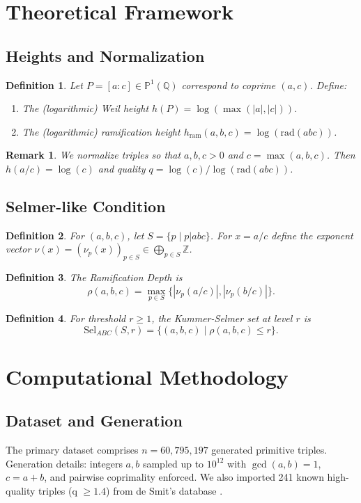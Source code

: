 \documentclass[11pt,a4paper]{article}
\newtheorem{definition}{Definition}[section]
\newtheorem{remark}{Remark}[section]
\newcommand{\Q}{\mathbb{Q}}
\newcommand{\Z}{\mathbb{Z}}
\newcommand{\Pp}{\mathbb{P}}
\newcommand{\rad}{\mathrm{rad}}
\newcommand{\Sel}{\mathrm{Sel}}
\begin{document}
\section{Theoretical Framework}

\subsection{Heights and Normalization}
\begin{definition}
Let $P=[a:c]\in\Pp^1(\Q)$ correspond to coprime $(a,c)$. Define:
\begin{enumerate}
    \item The (logarithmic) Weil height $h(P)=\log(\max(|a|,|c|))$.
    \item The (logarithmic) ramification height $h_{\mathrm{ram}}(a,b,c)=\log(\rad(abc))$.
\end{enumerate}
\end{definition}
\begin{remark}
We normalize triples so that $a,b,c>0$ and $c=\max(a,b,c)$. Then $h(a/c)=\log(c)$ and quality $q=\log(c)/\log(\rad(abc))$.
\end{remark}

\subsection{Selmer-like Condition}
\begin{definition}
For $(a,b,c)$, let $S=\{p\mid p|abc\}$. For $x=a/c$ define the exponent vector $\nu(x)=(\nu_p(x))_{p\in S}\in\bigoplus_{p\in S}\Z$.
\end{definition}
\begin{definition}
The Ramification Depth is
\[
\rho(a,b,c)=\max_{p\in S}\{|\nu_p(a/c)|,|\nu_p(b/c)|\}.
\]
\end{definition}
\begin{definition}
For threshold $r\ge1$, the Kummer-Selmer set at level $r$ is
\[
\Sel_{ABC}(S,r)=\{(a,b,c)\mid \rho(a,b,c)\le r\}.
\]
\end{definition}

\section{Computational Methodology}
\subsection{Dataset and Generation}
The primary dataset comprises $n=60{,}795{,}197$ generated primitive triples. Generation details: integers $a,b$ sampled up to $10^{12}$ with $\gcd(a,b)=1$, $c=a+b$, and pairwise coprimality enforced. We also imported 241 known high-quality triples (q $\ge 1.4$) from de Smit's database \cite{desmit}.
\end{document}
